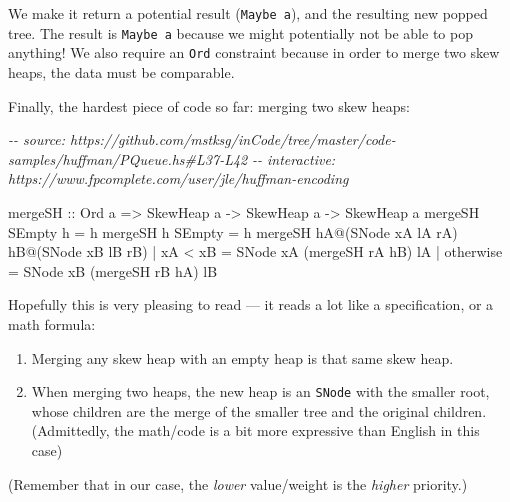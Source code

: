 \documentclass[]{article}
\newenvironment{Shaded}{}{}
\newcommand{\CommentTok}[1]{\textcolor[rgb]{0.38,0.63,0.69}{\textit{#1}}}
\newcommand{\DataTypeTok}[1]{\textcolor[rgb]{0.56,0.13,0.00}{#1}}
\newcommand{\FunctionTok}[1]{\textcolor[rgb]{0.02,0.16,0.49}{#1}}
\newcommand{\NormalTok}[1]{#1}
\newcommand{\OperatorTok}[1]{\textcolor[rgb]{0.40,0.40,0.40}{#1}}
\newcommand{\OtherTok}[1]{\textcolor[rgb]{0.00,0.44,0.13}{#1}}
\begin{document}
We make it return a potential result (\texttt{Maybe\ a}), and the resulting new
popped tree. The result is \texttt{Maybe\ a} because we might potentially not be
able to pop anything! We also require an \texttt{Ord} constraint because in
order to merge two skew heaps, the data must be comparable.

Finally, the hardest piece of code so far: merging two skew heaps:

\begin{Shaded}
\begin{Highlighting}[]
\CommentTok{{-}{-} source: https://github.com/mstksg/inCode/tree/master/code{-}samples/huffman/PQueue.hs\#L37{-}L42}
\CommentTok{{-}{-} interactive: https://www.fpcomplete.com/user/jle/huffman{-}encoding}

\OtherTok{mergeSH ::} \DataTypeTok{Ord}\NormalTok{ a }\OtherTok{=>} \DataTypeTok{SkewHeap}\NormalTok{ a }\OtherTok{{-}>} \DataTypeTok{SkewHeap}\NormalTok{ a }\OtherTok{{-}>} \DataTypeTok{SkewHeap}\NormalTok{ a}
\NormalTok{mergeSH }\DataTypeTok{SEmpty}\NormalTok{ h }\OtherTok{=}\NormalTok{ h}
\NormalTok{mergeSH h }\DataTypeTok{SEmpty} \OtherTok{=}\NormalTok{ h}
\NormalTok{mergeSH hA}\OperatorTok{@}\NormalTok{(}\DataTypeTok{SNode}\NormalTok{ xA lA rA) hB}\OperatorTok{@}\NormalTok{(}\DataTypeTok{SNode}\NormalTok{ xB lB rB)}
    \OperatorTok{|}\NormalTok{ xA }\OperatorTok{<}\NormalTok{ xB    }\OtherTok{=} \DataTypeTok{SNode}\NormalTok{ xA (mergeSH rA hB) lA}
    \OperatorTok{|} \FunctionTok{otherwise}  \OtherTok{=} \DataTypeTok{SNode}\NormalTok{ xB (mergeSH rB hA) lB}
\end{Highlighting}
\end{Shaded}

Hopefully this is very pleasing to read --- it reads a lot like a specification,
or a math formula:

\begin{enumerate}
\def\labelenumi{\arabic{enumi}.}
\tightlist
\item
  Merging any skew heap with an empty heap is that same skew heap.
\item
  When merging two heaps, the new heap is an \texttt{SNode} with the smaller
  root, whose children are the merge of the smaller tree and the original
  children. (Admittedly, the math/code is a bit more expressive than English in
  this case)
\end{enumerate}

(Remember that in our case, the \emph{lower} value/weight is the \emph{higher}
priority.)
\end{document}
